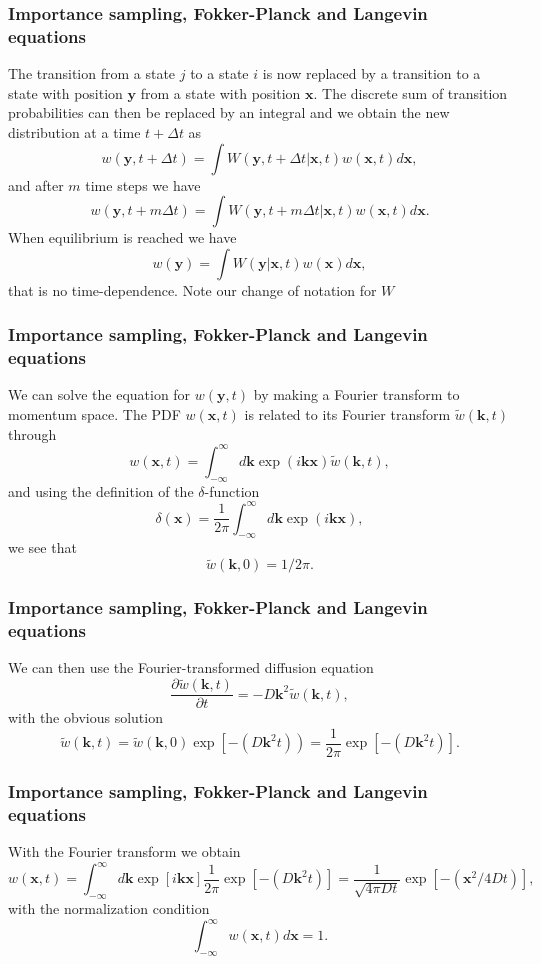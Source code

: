 \documentclass{beamer}
\begin{document}
\begin{frame}
\frametitle{Importance sampling, Fokker-Planck and Langevin equations}

The transition from a state $j$ to a state $i$ is now replaced by a transition
to a state with position $\mathbf{y}$ from a state with position $\mathbf{x}$. 
The discrete sum of transition probabilities can then be replaced by an integral
and we obtain the new distribution at a time $t+\Delta t$ as 
\[
   w(\mathbf{y},t+\Delta t)= \int W(\mathbf{y},t+\Delta t| \mathbf{x},t)w(\mathbf{x},t)d\mathbf{x},
\]
and after $m$ time steps we have
\[
   w(\mathbf{y},t+m\Delta t)= \int W(\mathbf{y},t+m\Delta t| \mathbf{x},t)w(\mathbf{x},t)d\mathbf{x}.
\]
When equilibrium is reached we have
\[
   w(\mathbf{y})= \int W(\mathbf{y}|\mathbf{x}, t)w(\mathbf{x})d\mathbf{x},
\]
that is no time-dependence. Note our change of notation for $W$
\end{frame}

\begin{frame}
\frametitle{Importance sampling, Fokker-Planck and Langevin equations}

We can solve the equation for $w(\mathbf{y},t)$ by making a Fourier transform to
momentum space. 
The PDF $w(\mathbf{x},t)$ is related to its Fourier transform
$\tilde{w}(\mathbf{k},t)$ through
\[
   w(\mathbf{x},t) = \int_{-\infty}^{\infty}d\mathbf{k} \exp{(i\mathbf{kx})}\tilde{w}(\mathbf{k},t),
\]
and using the definition of the 
$\delta$-function 
\[
   \delta(\mathbf{x}) = \frac{1}{2\pi} \int_{-\infty}^{\infty}d\mathbf{k} \exp{(i\mathbf{kx})},
\]
 we see that
\[
   \tilde{w}(\mathbf{k},0)=1/2\pi.
\]
\end{frame}

\begin{frame}
\frametitle{Importance sampling, Fokker-Planck and Langevin equations}

We can then use the Fourier-transformed diffusion equation 
\[
    \frac{\partial \tilde{w}(\mathbf{k},t)}{\partial t} = -D\mathbf{k}^2\tilde{w}(\mathbf{k},t),
\]
with the obvious solution
\[
   \tilde{w}(\mathbf{k},t)=\tilde{w}(\mathbf{k},0)\exp{\left[-(D\mathbf{k}^2t)\right)}=
    \frac{1}{2\pi}\exp{\left[-(D\mathbf{k}^2t)\right]}. 
\]
\end{frame}

\begin{frame}
\frametitle{Importance sampling, Fokker-Planck and Langevin equations}

With the Fourier transform we obtain 
\[
   w(\mathbf{x},t)=\int_{-\infty}^{\infty}d\mathbf{k} \exp{\left[i\mathbf{kx}\right]}\frac{1}{2\pi}\exp{\left[-(D\mathbf{k}^2t)\right]}=
    \frac{1}{\sqrt{4\pi Dt}}\exp{\left[-(\mathbf{x}^2/4Dt)\right]}, 
\]
with the normalization condition
\[
   \int_{-\infty}^{\infty}w(\mathbf{x},t)d\mathbf{x}=1.
\]
\end{frame}
\end{document}
